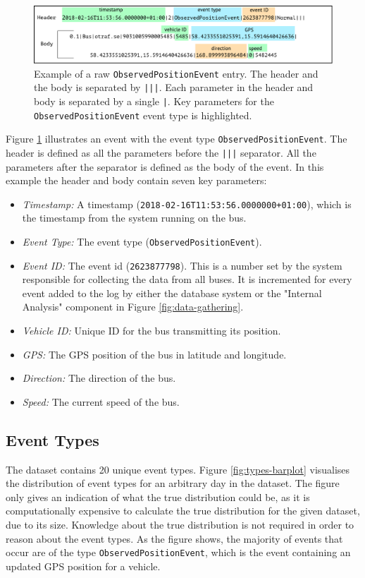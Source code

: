 \begin{figure}[ht!]
    \centering
    \includegraphics[width=\textwidth]{figures/data-example-1}
    \caption{Example of a raw \texttt{ObservedPositionEvent} entry.
    The header and the body is separated by \texttt{|||}.
    Each parameter in the header and body is separated by a single \texttt{|}.
    Key parameters for the \texttt{ObservedPositionEvent} event type is highlighted.}
    \label{fig:data-ex-1}
\end{figure}

Figure \ref{fig:data-ex-1} illustrates an event with the event type \texttt{ObservedPositionEvent}.
The header is defined as all the parameters before the \texttt{|||} separator.
All the parameters after the separator is defined as the body of the event.
In this example the header and body contain seven key parameters: 
\begin{itemize}
    \item \textit{Timestamp:} A timestamp (\texttt{2018-02-16T11:53:56.0000000+01:00}), which is the timestamp from the system running on the bus.
    \item \textit{Event Type:} The event type (\texttt{ObservedPositionEvent}).
    \item \textit{Event ID:} The event id (\texttt{2623877798}). This is a number set by the system responsible for collecting the data from all buses.
    It is incremented for every event added to the log by either the database system or the "Internal Analysis" component in Figure \ref{fig:data-gathering}.
    \item \textit{Vehicle ID:} Unique ID for the bus transmitting its position.
    \item \textit{GPS:} The GPS position of the bus in latitude and longitude.
    \item \textit{Direction:} The direction of the bus.
    \item \textit{Speed:} The current speed of the bus.
\end{itemize}

\subsection{Event Types}
The dataset contains 20 unique event types.
Figure \ref{fig:types-barplot} visualises the distribution of event types for an arbitrary day  in the dataset.
The figure only gives an indication of what the true distribution could be, as it is computationally expensive to calculate the true distribution for the given dataset, due to its size.
Knowledge about the true distribution is not required in order to reason about the event types.
As the figure shows, the majority of events that occur are of the type \texttt{ObservedPositionEvent}, which is the event containing an updated GPS position for a vehicle.

